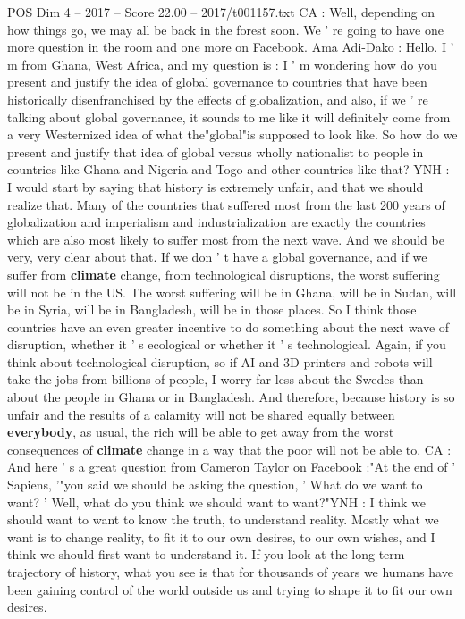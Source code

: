 \begin{textsample}{POS Dim 4 – 2017 – Score 22.00 – 2017/t001157.txt}
CA : Well, depending on how things go, we may all be back in the forest soon.
We ' re going to have one more question in the room and one more on Facebook.
Ama Adi-Dako : Hello.
I ' m from Ghana, West Africa, and my question is : I ' m wondering how do you present and justify the idea of global governance to countries that have been historically disenfranchised by the effects of globalization, and also, if we ' re talking about global governance, it sounds to me like it will definitely come from a very Westernized idea of what the"global"is supposed to look like.
So how do we present and justify that idea of global versus wholly nationalist to people in countries like Ghana and Nigeria and Togo and other countries like that?
YNH : I would start by saying that history is extremely unfair, and that we should realize that.
Many of the countries that suffered most from the last 200 years of globalization and imperialism and industrialization are exactly the countries which are also most likely to suffer most from the next wave.
And we should be very, very clear about that.
If we don ' t have a global governance, and if we suffer from \textbf{climate} change, from technological disruptions, the worst suffering will not be in the US.
The worst suffering will be in Ghana, will be in Sudan, will be in Syria, will be in Bangladesh, will be in those places.
So I think those countries have an even greater incentive to do something about the next wave of disruption, whether it ' s ecological or whether it ' s technological.
Again, if you think about technological disruption, so if AI and 3D printers and robots will take the jobs from billions of people, I worry far less about the Swedes than about the people in Ghana or in Bangladesh.
And therefore, because history is so unfair and the results of a calamity will not be shared equally between \textbf{everybody}, as usual, the rich will be able to get away from the worst consequences of \textbf{climate} change in a way that the poor will not be able to.
CA : And here ' s a great question from Cameron Taylor on Facebook :"At the end of ' Sapiens, '"you said we should be asking the question, ' What do we want to want? ' Well, what do you think we should want to want?"YNH : I think we should want to want to know the truth, to understand reality.
Mostly what we want is to change reality, to fit it to our own desires, to our own wishes, and I think we should first want to understand it.
If you look at the long-term trajectory of history, what you see is that for thousands of years we humans have been gaining control of the world outside us and trying to shape it to fit our own desires.

\end{textsample}
